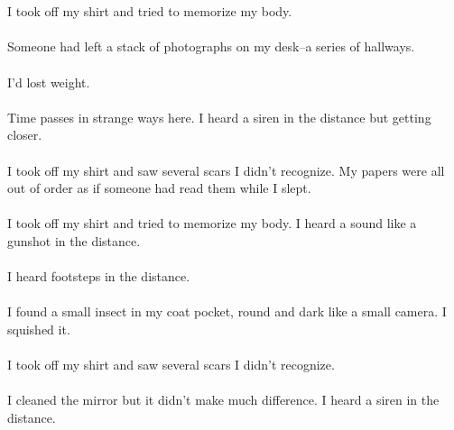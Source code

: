 \documentclass{article}
\begin{document}
    \section{}
    I took off my shirt and tried to memorize my body. \\\\Someone had left a stack of photographs on my desk--a series of hallways. \\\\I'd lost weight. \\\\Time passes in strange ways here. I heard a siren in the distance but getting closer. \\\\I took off my shirt and saw several scars I didn't recognize. My papers were all out of order as if someone had read them while I slept. \\\\I took off my shirt and tried to memorize my body. I heard a sound like a gunshot in the distance. \\\\I heard footsteps in the distance. \\\\I found a small insect in my coat pocket, round and dark like a small camera. I squished it. \\\\I took off my shirt and saw several scars I didn't recognize. \\\\I cleaned the mirror but it didn't make much difference. I heard a siren in the distance. \\\\
    \newpage
    
\end{document}
